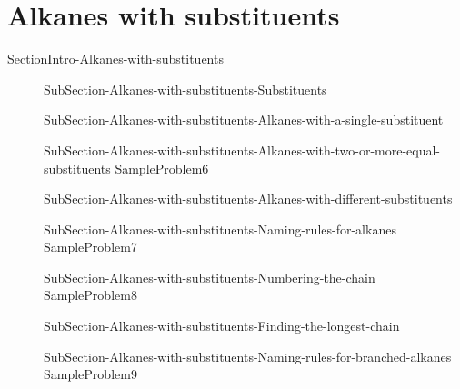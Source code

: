 \documentclass[main.tex]{subfiles}
\newcommand\chapterlabel{Ch-orgo}\setcounter{figurenewcounter}{0}\setcounter{tablenewcounter}{0}\setcounter{formulanewcounter}{0}
\begin{document}
 
\section{Alkanes with substituents}{SectionIntro-Alkanes-with-substituents}
\sloppy\begin{description}
\item[]{SubSection-Alkanes-with-substituents-Substituents}
\item[]{SubSection-Alkanes-with-substituents-Alkanes-with-a-single-substituent}
\hspace{4cm}{Table-Substituents}
\item[]{SubSection-Alkanes-with-substituents-Alkanes-with-two-or-more-equal-substituents}
{SampleProblem6}
\item[]{SubSection-Alkanes-with-substituents-Alkanes-with-different-substituents}
\item[]{SubSection-Alkanes-with-substituents-Naming-rules-for-alkanes}
{SampleProblem7}
\item[]{SubSection-Alkanes-with-substituents-Numbering-the-chain}
{SampleProblem8}
\item[]{SubSection-Alkanes-with-substituents-Finding-the-longest-chain}
\item[]{SubSection-Alkanes-with-substituents-Naming-rules-for-branched-alkanes}
{SampleProblem9}
\end{description}
\end{document}
